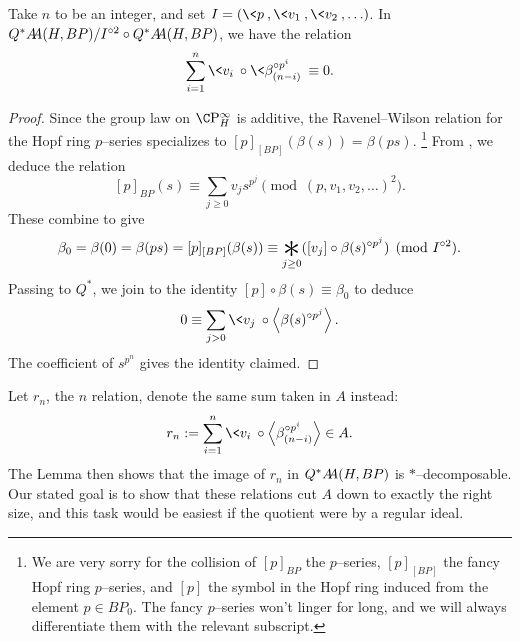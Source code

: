 \begin{lemma}
Take \(n\) to be an integer, and set \(I = (\<p\>, \<v_1\>, \<v_2\>, \ldots)\).
In \(Q^* \AA(H, BP) / I^{\circ 2} \circ Q^* \AA(H, BP)\), we have the relation \[\sum_{i=1}^n \<v_i\> \circ \<\beta_{(n-i)}^{\circ p^i}\> \equiv 0.\]
\end{lemma}
\begin{proof}
Since the group law on \(\CP^\infty_H\) is additive, the Ravenel--Wilson relation for the Hopf ring \(p\)--series specializes to \([p]_{[BP]}(\beta(s)) = \beta(ps)\).%
\footnote{%
We are very sorry for the collision of \([p]_{BP}\) the \(p\)--series, \([p]_{[BP]}\) the fancy Hopf ring \(p\)--series, and \([p]\) the symbol in the Hopf ring induced from the element \(p \in BP_0\).
The fancy \(p\)--series won't linger for long, and we will always differentiate them with the relevant subscript.
}
From , we deduce the relation \[[p]_{BP}(s) \equiv \sum_{j \ge 0} v_j s^{p^j} \pmod{(p, v_1, v_2, \ldots)^2}.\]
These combine to give \[\beta_0 = \beta(0) = \beta(ps) = [p]_{[BP]}(\beta(s)) \equiv \bigast_{j \ge 0} ([v_j] \circ \beta(s)^{\circ p^j}) \pmod{I^{\circ 2}}.\]
Passing to \(Q^*\), we join  to the identity \([p] \circ \beta(s) \equiv \beta_0\) to deduce \[0 \equiv \sum_{j > 0} \<v_j\> \circ \left\langle\beta(s)^{\circ p^j}\right\rangle.\]
The coefficient of \(s^{p^n}\) gives the identity claimed.
\end{proof}

Let \(r_n\), the \(n\){\th} relation, denote the same sum taken in \(A\) instead: \[r_n := \sum_{i=1}^n \<v_i\> \circ \left\langle\beta_{(n-i)}^{\circ p^i}\right\rangle \in A.\]
The Lemma then shows that the image of \(r_n\) in \(Q^* \AA(H, BP)\) is \(\ast\)--decomposable.
Our stated goal is to show that these relations cut \(A\) down to exactly the right size, and this task would be easiest if the quotient were by a regular ideal.

